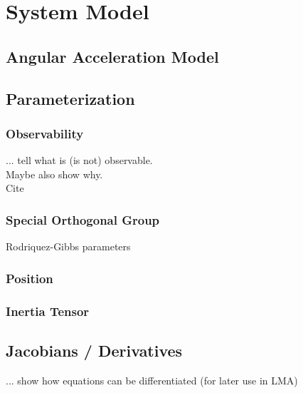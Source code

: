 \chapter{System Model}
\label{chap:sysmod}

\section{Angular Acceleration Model}

\section{Parameterization}
\subsection{Observability}
... tell what is (is not) observable. \\ Maybe also show why. \\ Cite \cite{hermann1977}

\subsection{Special Orthogonal Group}
Rodriquez-Gibbs parameters

\subsection{Position}

\subsection{Inertia Tensor}

\section{Jacobians / Derivatives}
... show how equations can be differentiated (for later use in LMA)